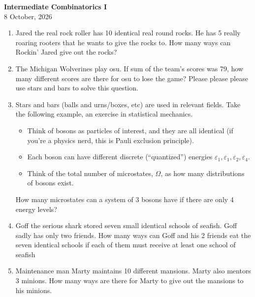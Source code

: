 \documentclass[inline]{article}
\begin{document}
\begin{center}
{\Large\bfseries Intermediate Combinatorics I}\\[0.25cm]
{\large 8 October, 2026}\\[1cm]
\end{center}

\begin{enumerate}[itemsep=2.85cm]
    \section{Problems}
    \item Jared the real rock roller has 10 identical real round rocks. He has 5 really roaring rooters that he wants to give the rocks to. How many ways can Rockin' Jared give out the rocks?
    \item The Michigan Wolverines play osu. If sum of the team's scores was 79, how many different scores are there for osu to lose the game? Please please please use stars and bars to solve this question.
    \item Stars and bars (balls and urns/boxes, etc) are used in relevant fields. Take the following example, an exercise in statistical mechanics. 
    \begin{itemize}
        \item Think of bosons as particles of interest, and they are all identical (if you're a physics nerd, this is Pauli exclusion principle).
        \item Each boson can have different discrete (``quantized'') energies $\varepsilon_1, \varepsilon_1, \varepsilon_2,\varepsilon_4$.
        \item Think of the total number of microstates, $\Omega$, as how many distributions of bosons exist.
    \end{itemize}
    How many microstates can a system of 3 bosons have if there are only 4 energy levels?
    \item Goff the serious shark stored seven small identical schools of seafish. Goff sadly has only two friends. How many ways can Goff and his 2 friends eat the seven identical schools if each of them must receive at least one school of seafish
    \item Maintenance man Marty maintains 10 different mansions. Marty also mentors 3 minions. How many ways are there for Marty to give out the mansions to his minions.

\end{enumerate}
\end{document}
